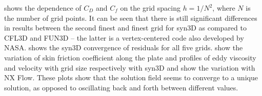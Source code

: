  shows the dependence of $C_D$ and $C_f$ on the grid spacing $h = 1/N^2$, where $N$ is the number of grid points. It can be seen that there is still significant differences in results between the second finest and finest grid for syn3D as compared to CFL3D and FUN3D -- the latter is a vertex-centered code also developed by NASA.  shows the syn3D convergence of residuals for all five grids.   show the variation of skin friction coefficient along the plate and profiles of eddy viscosity and velocity with grid size respectively with syn3D and  show the variation with NX Flow. These plots show that the solution field seems to converge to a unique solution, as opposed to oscillating back and forth between different values.
